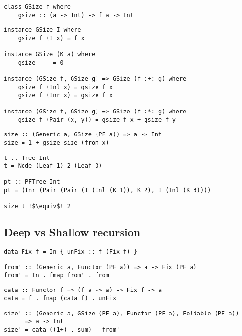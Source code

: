 \begin{verbatim}
class GSize f where
    gsize :: (a -> Int) -> f a -> Int
\end{verbatim}

\begin{verbatim}
instance GSize I where
    gsize f (I x) = f x

instance GSize (K a) where
    gsize _ _ = 0

instance (GSize f, GSize g) => GSize (f :+: g) where
    gsize f (Inl x) = gsize f x
    gsize f (Inr x) = gsize f x

instance (GSize f, GSize g) => GSize (f :*: g) where
    gsize f (Pair (x, y)) = gsize f x + gsize f y
\end{verbatim}

\begin{verbatim}
size :: (Generic a, GSize (PF a)) => a -> Int
size = 1 + gsize size (from x)
\end{verbatim}


\begin{verbatim}
t :: Tree Int
t = Node (Leaf 1) 2 (Leaf 3)

pt :: PFTree Int
pt = (Inr (Pair (Pair (I (Inl (K 1)), K 2), I (Inl (K 3)))) 

size t !$\equiv$! 2
\end{verbatim}

\subsection{Deep vs Shallow recursion}
\begin{verbatim}
data Fix f = In { unFix :: f (Fix f) }
\end{verbatim}
    
\begin{verbatim}
from' :: (Generic a, Functor (PF a)) => a -> Fix (PF a)
from' = In . fmap from' . from
\end{verbatim}

\begin{verbatim}
cata :: Functor f => (f a -> a) -> Fix f -> a
cata = f . fmap (cata f) . unFix
\end{verbatim}

\begin{verbatim}
size' :: (Generic a, GSize (PF a), Functor (PF a), Foldable (PF a)) 
      => a -> Int
size' = cata ((1+) . sum) . from'
\end{verbatim}

